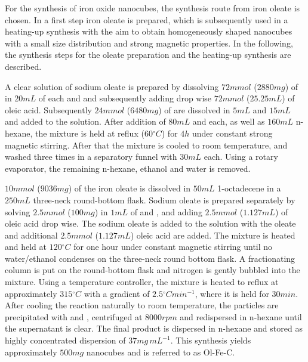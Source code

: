 \documentclass[\main/dresen_thesis.tex]{subfiles}
\begin{document}
  \label{sec:colloidalCrystals:nanoparticle:synthesisOleatesAcAc}
  For the synthesis of iron oxide nanocubes, the synthesis route from iron oleate is chosen.
  In a first step iron oleate is prepared, which is subsequently used in a heating-up synthesis with the aim to obtain homogeneously shaped nanocubes with a small size distribution and strong magnetic properties.
  In the following, the synthesis steps for the oleate preparation and the heating-up synthesis are described.

    A clear solution of sodium oleate is prepared by dissolving $72 \unit{mmol}$ ($2880 \unit{mg}$) of  in $20 \unit{mL}$ of each  and  and subsequently adding drop wise $72 \unit{mmol}$ ($25.25 \unit{mL}$) of oleic acid.
    Subsequently $24 \unit{mmol}$ ($6480 \unit{mg}$) of  are dissolved in $5 \unit{mL}$  and $15 \unit{mL}$  and added to the solution.
    After addition of $80 \unit{mL}$  and  each, as well as $160 \unit{mL}$ n-hexane, the mixture is held at reflux ($60 \unit{^\circ C}$) for $4 \unit{h}$ under constant strong magnetic stirring.
    After that the mixture is cooled to room temperature, and washed three times in a separatory funnel with $30 \unit{mL}$  each.
    Using a rotary evaporator, the remaining n-hexane, ethanol and water is removed.

    $10 \unit{mmol}$ ($9036 \unit{mg}$) of the iron oleate is dissolved in $50 \unit{mL}$ 1-octadecene in a $250 \unit{mL}$ three-neck round-bottom flask.
    Sodium oleate is prepared separately by solving $2.5 \unit{mmol}$ ($100 \unit{mg}$)  in $1 \unit{mL}$ of  and , and adding $2.5 \unit{mmol}$ ($1.127 \unit{mL}$) of oleic acid drop wise.
    The sodium oleate is added to the solution with the oleate and additional $2.5 \unit{mmol}$ ($1.127 \unit{mL}$) oleic acid are added.
    The mixture is heated and held at $120 \unit{^\circ C}$ for one hour under constant magnetic stirring until no water/ethanol condenses on the three-neck round bottom flask.
    A fractionating column is put on the round-bottom flask and nitrogen is gently bubbled into the mixture.
    Using a temperature controller, the mixture is heated to reflux at approximately $315 \unit{^\circ C}$ with a gradient of $2.5 \unit{^\circ C min^{-1}}$, where it is held for $30 \unit{min}$.
    After cooling the reaction naturally to room temperature, the particles are precipitated with  and , centrifuged at $8000 \unit{rpm}$ and redispersed in n-hexane until the supernatant is clear.
    The final product is dispersed in n-hexane and stored as highly concentrated dispersion of $37 \unit{mg \, mL^{-1}}$.
    This synthesis yields approximately $500 \unit{mg}$ nanocubes and is referred to as Ol-Fe-C.
  
\end{document}
